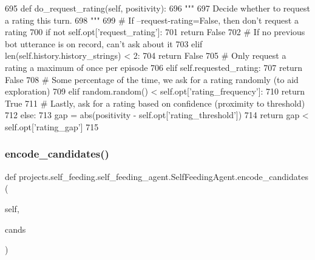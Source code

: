 \begin{DoxyCode}
695     \textcolor{keyword}{def }do\_request\_rating(self, positivity):
696         \textcolor{stringliteral}{"""}
697 \textcolor{stringliteral}{        Decide whether to request a rating this turn.}
698 \textcolor{stringliteral}{        """}
699         \textcolor{comment}{# If --request-rating=False, then don't request a rating}
700         \textcolor{keywordflow}{if} \textcolor{keywordflow}{not} self.opt[\textcolor{stringliteral}{'request\_rating'}]:
701             \textcolor{keywordflow}{return} \textcolor{keyword}{False}
702         \textcolor{comment}{# If no previous bot utterance is on record, can't ask about it}
703         \textcolor{keywordflow}{elif} len(self.history.history\_strings) < 2:
704             \textcolor{keywordflow}{return} \textcolor{keyword}{False}
705         \textcolor{comment}{# Only request a rating a maximum of once per episode}
706         \textcolor{keywordflow}{elif} self.requested\_rating:
707             \textcolor{keywordflow}{return} \textcolor{keyword}{False}
708         \textcolor{comment}{# Some percentage of the time, we ask for a rating randomly (to aid exploration)}
709         \textcolor{keywordflow}{elif} random.random() < self.opt[\textcolor{stringliteral}{'rating\_frequency'}]:
710             \textcolor{keywordflow}{return} \textcolor{keyword}{True}
711         \textcolor{comment}{# Lastly, ask for a rating based on confidence (proximity to threshold)}
712         \textcolor{keywordflow}{else}:
713             gap = abs(positivity - self.opt[\textcolor{stringliteral}{'rating\_threshold'}])
714             \textcolor{keywordflow}{return} gap < self.opt[\textcolor{stringliteral}{'rating\_gap'}]
715 
\end{DoxyCode}
\mbox{\label{classprojects_1_1self__feeding_1_1self__feeding__agent_1_1SelfFeedingAgent_a3208c69de4a2452cafa3d7feeec85218}} 
\subsubsection{\texorpdfstring{encode\+\_\+candidates()}{encode\_candidates()}}
{\footnotesize\ttfamily def projects.\+self\+\_\+feeding.\+self\+\_\+feeding\+\_\+agent.\+Self\+Feeding\+Agent.\+encode\+\_\+candidates (\begin{DoxyParamCaption}\item[{}]{self,  }\item[{}]{cands }\end{DoxyParamCaption})}

